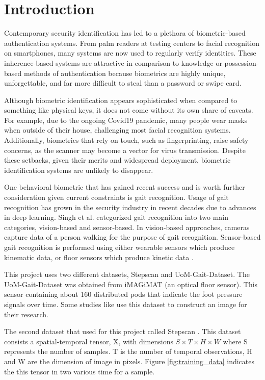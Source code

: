 \section{Introduction}

Contemporary security identification has led to a plethora of biometric-based authentication systems. From palm readers at testing centers to facial recognition on smartphones, many systems are now used to regularly verify identities. These inherence-based systems are attractive in comparison to knowledge or possession-based methods of authentication because biometrics are highly unique, unforgettable, and far more difficult to steal than a password or swipe card.

Although biometric identification appears sophisticated when compared to something like physical keys, it does not come without its own share of caveats. For example, due to the ongoing Covid19 pandemic, many people wear masks when outside of their house, challenging most facial recognition systems. Additionally, biometrics that rely on touch, such as fingerprinting, raise safety concerns, as the scanner may become a vector for virus transmission. Despite these setbacks, given their merits and widespread deployment, biometric identification systems are unlikely to disappear.

One behavioral biometric that has gained recent success and is worth further consideration given current constraints is gait recognition. Usage of gait recognition has grown in the security industry in recent decades due to advances in deep learning. Singh et al. \cite{Singh2019APerspectives} categorized gait recognition into two main categories, vision-based and sensor-based. In vision-based approaches, cameras capture data of a person walking for the purpose of gait recognition. Sensor-based gait recognition is performed using either wearable sensors which produce kinematic data, or floor sensors which produce kinetic data \cite{Connor2018BiometricFeatures}.




This project uses two different datasets, Stepscan and UoM-Gait-Dataset. The UoM-Gait-Dataset was obtained from iMAGiMAT \cite{Cantoral-Ceballos2015IntelligentEnvironments}(an optical floor sensor). This sensor containing about 160 distributed \gls{pods} that indicate the foot pressure signals over time. Some studies like \cite{} use this dataset to construct an image for their research.

The second dataset that used for this project called Stepscan \cite{Connor2015ComparingBiometrics}. This dataset consists a spatial-temporal tensor, X, with dimensions $S × T × H × W$ where S represents the number of samples. T is the number of temporal observations, H and W are the dimension of image in pixels. Figure \ref{fig:training_data} indicates the this tensor in two various time for a sample.

